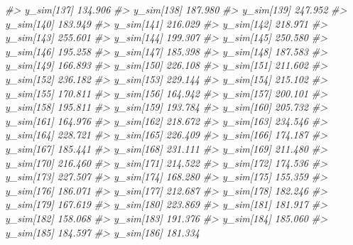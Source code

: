 \documentclass[
  10pt,
  italian,
  a4paper,
  extrafontsizes,onecolumn,openright
  ]{memoir}
\newenvironment{Shaded}{\begin{snugshade}}{\end{snugshade}}
\newcommand{\CommentTok}[1]{\textcolor[rgb]{0.56,0.35,0.01}{\textit{#1}}}
\begin{document}
\begin{Shaded}
\begin{Highlighting}[]
\CommentTok{\#\textgreater{}   y\_sim[137] 134.906}
\CommentTok{\#\textgreater{}   y\_sim[138] 187.980}
\CommentTok{\#\textgreater{}   y\_sim[139] 247.952}
\CommentTok{\#\textgreater{}   y\_sim[140] 183.949}
\CommentTok{\#\textgreater{}   y\_sim[141] 216.029}
\CommentTok{\#\textgreater{}   y\_sim[142] 218.971}
\CommentTok{\#\textgreater{}   y\_sim[143] 255.601}
\CommentTok{\#\textgreater{}   y\_sim[144] 199.307}
\CommentTok{\#\textgreater{}   y\_sim[145] 250.580}
\CommentTok{\#\textgreater{}   y\_sim[146] 195.258}
\CommentTok{\#\textgreater{}   y\_sim[147] 185.398}
\CommentTok{\#\textgreater{}   y\_sim[148] 187.583}
\CommentTok{\#\textgreater{}   y\_sim[149] 166.893}
\CommentTok{\#\textgreater{}   y\_sim[150] 226.108}
\CommentTok{\#\textgreater{}   y\_sim[151] 211.602}
\CommentTok{\#\textgreater{}   y\_sim[152] 236.182}
\CommentTok{\#\textgreater{}   y\_sim[153] 229.144}
\CommentTok{\#\textgreater{}   y\_sim[154] 215.102}
\CommentTok{\#\textgreater{}   y\_sim[155] 170.811}
\CommentTok{\#\textgreater{}   y\_sim[156] 164.942}
\CommentTok{\#\textgreater{}   y\_sim[157] 200.101}
\CommentTok{\#\textgreater{}   y\_sim[158] 195.811}
\CommentTok{\#\textgreater{}   y\_sim[159] 193.784}
\CommentTok{\#\textgreater{}   y\_sim[160] 205.732}
\CommentTok{\#\textgreater{}   y\_sim[161] 164.976}
\CommentTok{\#\textgreater{}   y\_sim[162] 218.672}
\CommentTok{\#\textgreater{}   y\_sim[163] 234.546}
\CommentTok{\#\textgreater{}   y\_sim[164] 228.721}
\CommentTok{\#\textgreater{}   y\_sim[165] 226.409}
\CommentTok{\#\textgreater{}   y\_sim[166] 174.187}
\CommentTok{\#\textgreater{}   y\_sim[167] 185.441}
\CommentTok{\#\textgreater{}   y\_sim[168] 231.111}
\CommentTok{\#\textgreater{}   y\_sim[169] 211.480}
\CommentTok{\#\textgreater{}   y\_sim[170] 216.460}
\CommentTok{\#\textgreater{}   y\_sim[171] 214.522}
\CommentTok{\#\textgreater{}   y\_sim[172] 174.536}
\CommentTok{\#\textgreater{}   y\_sim[173] 227.507}
\CommentTok{\#\textgreater{}   y\_sim[174] 168.280}
\CommentTok{\#\textgreater{}   y\_sim[175] 155.359}
\CommentTok{\#\textgreater{}   y\_sim[176] 186.071}
\CommentTok{\#\textgreater{}   y\_sim[177] 212.687}
\CommentTok{\#\textgreater{}   y\_sim[178] 182.246}
\CommentTok{\#\textgreater{}   y\_sim[179] 167.619}
\CommentTok{\#\textgreater{}   y\_sim[180] 223.869}
\CommentTok{\#\textgreater{}   y\_sim[181] 181.917}
\CommentTok{\#\textgreater{}   y\_sim[182] 158.068}
\CommentTok{\#\textgreater{}   y\_sim[183] 191.376}
\CommentTok{\#\textgreater{}   y\_sim[184] 185.060}
\CommentTok{\#\textgreater{}   y\_sim[185] 184.597}
\CommentTok{\#\textgreater{}   y\_sim[186] 181.334}

\end{Highlighting}
\end{Shaded}
\end{document}
